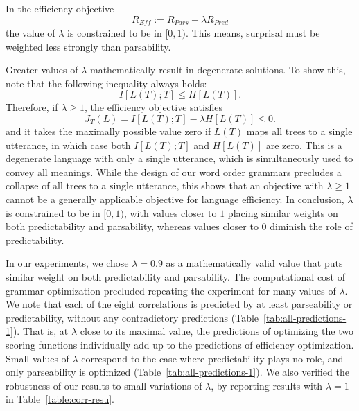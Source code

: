 \documentclass[10pt,twoside,lineno]{article}
\begin{document}
In the efficiency objective
\begin{equation}\label{eq:efficiency}
	R_{\textit{Eff}} := R_{\textit{Pars}} + \lambda R_\textit{Pred}
\end{equation}
the value of $\lambda$ is constrained to be in $[0,1)$.
This means, surprisal must be weighted less strongly than parsability.

Greater values of $\lambda$ mathematically result in degenerate solutions.
To show this, note that the following inequality always holds:
\begin{equation}
I[L(T); T] \leq H[L(T)].
\end{equation}
Therefore, if $\lambda \geq 1$, the efficiency objective satisfies 
\begin{equation}
    J_T(L) = I[L(T); T] - \lambda H[L(T)] \leq 0.
\end{equation}
and it takes the maximally possible value zero if $L(T)$ maps all trees to a single utterance, in which case both $I[L(T); T]$ and $H[L(T)]$ are zero.
This is a degenerate language with only a single utterance, which is simultaneously used to convey all meanings.
While the design of our word order grammars precludes a collapse of all trees to a single utterance, this shows that an objective with $\lambda \geq 1$ cannot be a generally applicable objective for language efficiency.
In conclusion, $\lambda$ is constrained to be in $[0,1)$, with values closer to $1$ placing similar weights on both predictability and parsability, whereas values closer to $0$ diminish the role of predictability.

In our experiments, we chose $\lambda = 0.9$ as a mathematically valid value that puts similar weight on both predictability and parsability.
The computational cost of grammar optimization precluded repeating the experiment for many values of $\lambda$.
We note that each of the eight correlations is predicted by at least parseability or predictability, without any contradictory predictions (Table~\ref{tab:all-predictions-1}).
That is, at $\lambda$ close to its maximal value, the predictions of optimizing the two scoring functions individually add up to the predictions of efficiency optimization.
Small values of $\lambda$ correspond to the case where predictability plays no role, and only parseability is optimized (Table~\ref{tab:all-predictions-1}).
We also verified the robustness of our results to small variations of $\lambda$, by reporting results with $\lambda=1$ in Table~\ref{table:corr-resu}.
\end{document}
